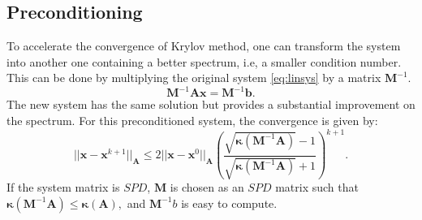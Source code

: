 \documentclass[12pt]{article}
\numberwithin{equation}{section}
\begin{document}
 \subsection{Preconditioning}
\hspace{0.5cm}To accelerate the convergence of Krylov method, one can transform the system into
another one containing a better spectrum, i.e, a smaller condition number. 
This can be done by multiplying the original system \eqref{eq:linsys} by a matrix $\mathbf{M}^{-1}.$
\begin{equation}\label{eq:precon}
 \mathbf{M}^{-1}\mathbf{A}\mathbf{x}=\mathbf{M}^{-1}\mathbf{b}.
\end{equation}
The new system has the same solution but provides a substantial improvement on the spectrum. 
For this preconditioned system, the convergence is given by:
\begin{equation}\label{eq:convp}
 ||\mathbf{x}-\mathbf{x}^{k+1}||_\mathbf{A}\leq 2||\mathbf{x}-\mathbf{x}^{0}||_\mathbf{A} 
 \left( \frac{\sqrt{\mathbf{\kappa}(\mathbf{M}^{-1}\mathbf{A})}-1}{\sqrt{\mathbf{\kappa}(\mathbf{M}^{-1}\mathbf{A})}+1} \right)^{k+1}.
\end{equation}
If the system matrix is $SPD$, $\mathbf{M}$ is chosen as an $SPD$ matrix such that $\mathbf{\kappa}(\mathbf{M}^{-1}\mathbf{A})\leq \mathbf{\kappa}(\mathbf{A}),$ and $\mathbf{M}^{-1}b$ is easy to compute.
\end{document}
